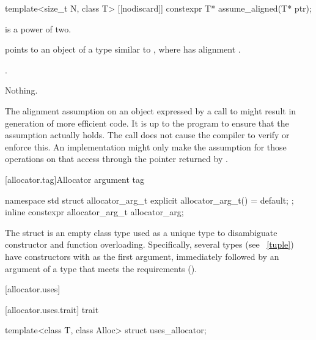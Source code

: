 %
\begin{itemdecl}
template<size_t N, class T>
  [[nodiscard]] constexpr T* assume_aligned(T* ptr);
\end{itemdecl}

\begin{itemdescr}
\pnum
\mandates
{} is a power of two.

\pnum
\expects
{} points to an object  of
a type similar to ,
where  has alignment .

\pnum
\returns
{}.

\pnum
\throws
Nothing.

\pnum
\begin{note}
The alignment assumption on an object 
expressed by a call to 
might result in generation of more efficient code.
It is up to the program to ensure that the assumption actually holds.
The call does not cause the compiler to verify or enforce this.
An implementation might only make the assumption
for those operations on  that access 
through the pointer returned by .
\end{note}
\end{itemdescr}

[allocator.tag]{Allocator argument tag}

%
%
\begin{itemdecl}
namespace std {
  struct allocator_arg_t { explicit allocator_arg_t() = default; };
  inline constexpr allocator_arg_t allocator_arg{};
}
\end{itemdecl}

\pnum
The  struct is an empty class type used as a unique type to
disambiguate constructor and function overloading. Specifically, several types (see
~\ref{tuple}) have constructors with  as the first
argument, immediately followed by an argument of a type that meets the
 requirements ().

[allocator.uses]{}

[allocator.uses.trait]{ trait}

%
\begin{itemdecl}
template<class T, class Alloc> struct uses_allocator;
\end{itemdecl}

